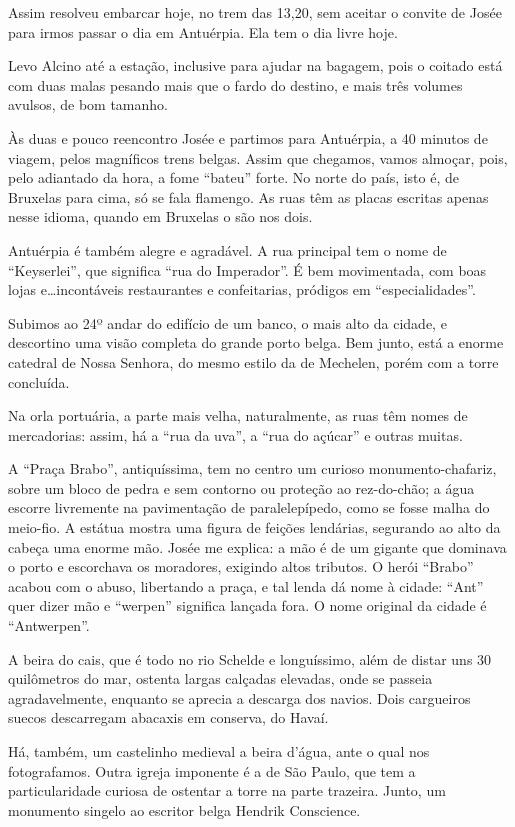 Assim resolveu embarcar hoje, no trem das 13,20, sem aceitar o convite de Josée para irmos passar o dia em Antuérpia. Ela tem o dia livre hoje.

Levo Alcino até a estação, inclusive para ajudar na bagagem, pois o coitado está com duas malas pesando mais que o fardo do destino, e mais três volumes avulsos, de bom tamanho.

Às duas e pouco reencontro Josée e partimos para Antuérpia, a 40 minutos de viagem, pelos magníficos trens belgas. Assim que chegamos, vamos almoçar, pois, pelo adiantado da hora, a fome ``bateu'' forte. No norte do país, isto é, de Bruxelas para cima, só se fala flamengo. As ruas têm as placas escritas apenas nesse idioma, quando em Bruxelas o são nos dois.

Antuérpia é também alegre e agradável. A rua principal tem o nome de ``Keyserlei'', que significa ``rua do Imperador''. É bem movimentada, com boas lojas e\ldots incontáveis restaurantes e confeitarias, pródigos em ``especialidades''.

Subimos ao 24º andar do edifício de um banco, o mais alto da cidade, e descortino uma visão completa do grande porto belga. Bem junto, está a enorme catedral de Nossa Senhora, do mesmo estilo da de Mechelen, porém com a torre concluída.

Na orla portuária, a parte mais velha, naturalmente, as ruas têm nomes de mercadorias: assim, há a ``rua da uva'', a ``rua do açúcar'' e outras muitas.

A ``Praça Brabo'', antiquíssima, tem no centro um curioso monumento-chafariz, sobre um bloco de pedra e sem contorno ou proteção ao rez-do-chão; a água escorre livremente na pavimentação de paralelepípedo, como se fosse malha do meio-fio. A estátua mostra uma figura de feições lendárias, segurando ao alto da cabeça uma enorme mão. Josée me explica: a mão é de um gigante que dominava o porto e escorchava os moradores, exigindo altos tributos. O herói ``Brabo'' acabou com o abuso, libertando a praça, e tal lenda dá nome à cidade: ``Ant'' quer dizer mão e ``werpen'' significa lançada fora. O nome original da cidade é ``Antwerpen''.

A beira do cais, que é todo no rio Schelde e longuíssimo, além de distar uns 30 quilômetros do mar, ostenta largas calçadas elevadas, onde se passeia agradavelmente, enquanto se aprecia a descarga dos navios. Dois cargueiros suecos descarregam abacaxis em conserva, do Havaí.

Há, também, um castelinho medieval a beira d’água, ante o qual nos fotografamos. Outra igreja imponente é a de São Paulo, que tem a particularidade curiosa de ostentar a torre na parte trazeira. Junto, um monumento singelo ao escritor belga Hendrik Conscience.

